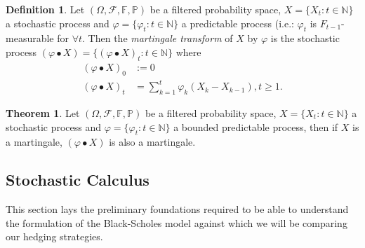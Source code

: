 \documentclass{article}
\theoremstyle{definition}
\newtheorem{definition}{Definition}[section]
\newtheorem{theorem}{Theorem}
\begin{document}
\begin{definition}
    Let $(\Omega, \mathcal{F}, \mathbb{F}, \mathbb{P})$ be a filtered probability space, $X = \{X_t : t \in \mathbb{N}\}$ a stochastic process and $\varphi = \{\varphi_t: t \in \mathbb{N}\}$ a predictable process (i.e.: $\varphi_t$ is $F_{t-1}$-measurable for $\forall t$. Then the \textit{martingale transform} of $X$ by $\varphi$ is the stochastic process $(\varphi \bullet X) = \{(\varphi \bullet X)_t: t \in \mathbb{N}\}$ where
    \begin{align*}
        (\varphi \bullet X)_0 &:= 0\\
        (\varphi \bullet X)_t &= \sum_{k=1}^t\varphi_k(X_k-X_{k-1}), t \geq 1.
    \end{align*}
\end{definition}

\begin{theorem}
    \label{Martingale transform}
    Let $(\Omega, \mathcal{F}, \mathbb{F}, \mathbb{P})$ be a filtered probability space, $X = \{X_t : t \in \mathbb{N}\}$ a stochastic process and $\varphi = \{\varphi_t: t \in \mathbb{N}\}$ a bounded predictable process, then if $X$ is a martingale, $(\varphi \bullet X)$ is also a martingale. 
\end{theorem}
\subsection{Stochastic Calculus}
This section lays the preliminary foundations required to be able to understand the formulation of the Black-Scholes model against which we will be comparing our hedging strategies.
\end{document}
